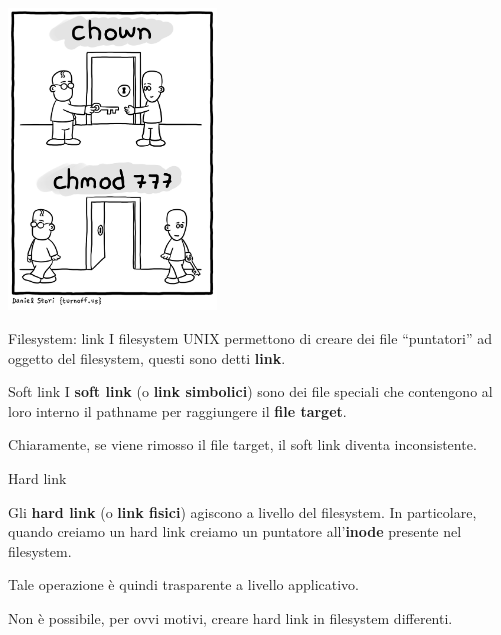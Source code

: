 \documentclass{beamer}
\begin{document}
    \begin{frame}{}
        \centering
        \includegraphics[height=8cm, keepaspectratio]{images/chown-chmod.png}
    \end{frame}

    \begin{frame}{Filesystem: link}
        I filesystem UNIX permettono di creare dei file ``puntatori'' ad oggetto del filesystem, questi sono detti \textbf{link}.
        \begin{alertblock}{Soft link}
            \small
            I \textbf{soft link} (o \textbf{link simbolici}) sono dei file
            speciali che contengono al loro interno il pathname per raggiungere il \textbf{file target}.

            Chiaramente, se viene rimosso il file target, il soft link diventa inconsistente.
        \end{alertblock}

        \begin{alertblock}{Hard link}
            \small

            Gli \textbf{hard link} (o \textbf{link fisici}) agiscono a livello del filesystem. In particolare,
            quando creiamo un hard link creiamo un puntatore all'\textbf{inode} presente nel filesystem.

            Tale operazione è quindi trasparente a livello applicativo.
            
            Non è possibile, per ovvi motivi, creare hard link in filesystem differenti.
        \end{alertblock}
    \end{frame}
\end{document}
